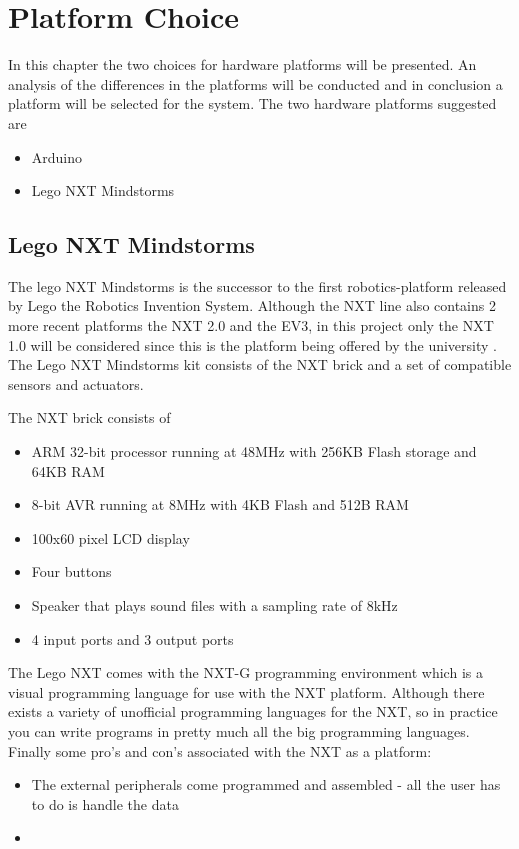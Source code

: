 \chapter{Platform Choice}
In this chapter the two choices for hardware platforms will be presented. An analysis of the differences in the platforms will be conducted and in conclusion a platform will be selected for the system. The two hardware platforms suggested are
\begin{itemize}
	\item Arduino
	\item Lego NXT Mindstorms
\end{itemize}

\section{Lego NXT Mindstorms}
The lego NXT Mindstorms is the successor to the first robotics-platform released by Lego the Robotics Invention System.
Although the NXT line also contains 2 more recent platforms the NXT 2.0 and the EV3, in this project only the NXT 1.0 will be considered
since this is the platform being offered by the university \Source.\nl
The Lego NXT Mindstorms kit consists of the NXT brick and a set of compatible sensors and actuators.\nl

The NXT brick consists of \Source
\begin{itemize}
  \item ARM 32-bit processor running at 48MHz with 256KB Flash storage and 64KB RAM
  \item 8-bit AVR running at 8MHz with 4KB Flash and 512B RAM
  \item 100x60 pixel LCD display
  \item Four buttons
  \item Speaker that plays sound files with a sampling rate of 8kHz
  \item 4 input ports and 3 output ports
\end{itemize}

The Lego NXT comes with the NXT-G programming environment which is a visual programming language for use with the NXT platform.
Although there exists a variety of unofficial programming languages for the NXT, so in practice you can write programs
in pretty much all the big programming languages\Source.
Finally some pro's and con's associated with the NXT as a platform\Source:
\begin{itemize}
  \item The external peripherals come programmed and assembled - all the user has to do is handle the data
  \item
\end{itemize}
